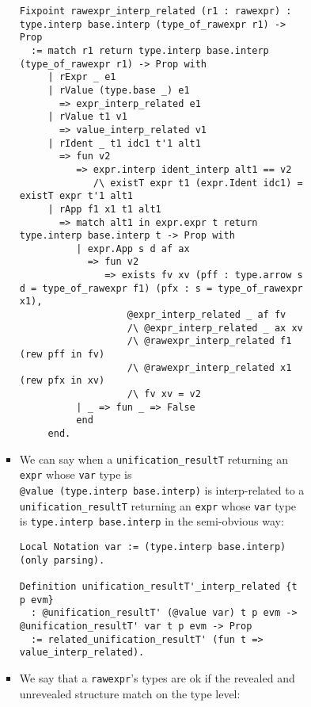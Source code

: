 \begin{itemize}
\begin{itemize}
\begin{itemize}
\begin{itemize}
\begin{itemize}
\begin{itemize}
\begin{verbatim}
Fixpoint rawexpr_interp_related (r1 : rawexpr) : type.interp base.interp (type_of_rawexpr r1) -> Prop
  := match r1 return type.interp base.interp (type_of_rawexpr r1) -> Prop with
     | rExpr _ e1
     | rValue (type.base _) e1
       => expr_interp_related e1
     | rValue t1 v1
       => value_interp_related v1
     | rIdent _ t1 idc1 t'1 alt1
       => fun v2
          => expr.interp ident_interp alt1 == v2
             /\ existT expr t1 (expr.Ident idc1) = existT expr t'1 alt1
     | rApp f1 x1 t1 alt1
       => match alt1 in expr.expr t return type.interp base.interp t -> Prop with
          | expr.App s d af ax
            => fun v2
               => exists fv xv (pff : type.arrow s d = type_of_rawexpr f1) (pfx : s = type_of_rawexpr x1),
                   @expr_interp_related _ af fv
                   /\ @expr_interp_related _ ax xv
                   /\ @rawexpr_interp_related f1 (rew pff in fv)
                   /\ @rawexpr_interp_related x1 (rew pfx in xv)
                   /\ fv xv = v2
          | _ => fun _ => False
          end
     end.
\end{verbatim}
          \item
            We can say when a
            \texttt{unification\_resultT\textquotesingle{}} returning an
            \texttt{expr} whose \texttt{var} type is
            \texttt{@value\ (type.interp\ base.interp)} is
            interp-related to a
            \texttt{unification\_resultT\textquotesingle{}} returning an
            \texttt{expr} whose \texttt{var} type is
            \texttt{type.interp\ base.interp} in the semi-obvious way:

\begin{verbatim}
Local Notation var := (type.interp base.interp) (only parsing).

Definition unification_resultT'_interp_related {t p evm}
  : @unification_resultT' (@value var) t p evm -> @unification_resultT' var t p evm -> Prop
  := related_unification_resultT' (fun t => value_interp_related).
\end{verbatim}
          \item
            We say that a \texttt{rawexpr}'s types are ok if the
            revealed and unrevealed structure match on the type level:


\end{itemize}
\end{itemize}
\end{itemize}
\end{itemize}
\end{itemize}
\end{itemize}
